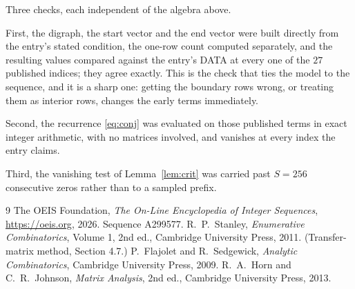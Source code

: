 \documentclass[11pt,a4paper]{article}
\theoremstyle{plain}
\theoremstyle{definition}
\begin{document}
Three checks, each independent of the algebra above.

First, the digraph, the start vector and the end vector were built directly from the
entry's stated condition, the one-row count computed separately, and the resulting values
compared against the entry's DATA at every one of the $27$ published indices; they
agree exactly. This is the check that ties the model to the sequence, and it is a sharp one:
getting the boundary rows wrong, or treating them as interior rows, changes the early terms
immediately.

Second, the recurrence \eqref{eq:conj} was evaluated on those published terms in exact
integer arithmetic, with no matrices involved, and vanishes at every index the entry claims.

Third, the vanishing test of Lemma~\ref{lem:crit} was carried past $S=256$ consecutive
zeros rather than to a sampled prefix.

\begin{thebibliography}{9}
 The OEIS Foundation, \emph{The On-Line Encyclopedia of Integer
Sequences}, \url{https://oeis.org}, 2026. Sequence A299577.
 R.~P.~Stanley, \emph{Enumerative Combinatorics}, Volume 1, 2nd ed.,
Cambridge University Press, 2011. (Transfer-matrix method, Section 4.7.)
 P.~Flajolet and R.~Sedgewick, \emph{Analytic Combinatorics}, Cambridge
University Press, 2009.
 R.~A.~Horn and C.~R.~Johnson, \emph{Matrix Analysis}, 2nd ed., Cambridge
University Press, 2013.
\end{thebibliography}
\end{document}

